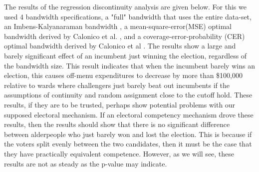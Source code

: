 The results of the regression discontinuity analysis are given below. 
For this we used 4 bandwidth specifications, a "full" bandwidth that uses the entire data-set, an Imbens-Kalyanaraman bandwidth \cite{IK_bandwidth}, a mean-square-error(MSE) optimal bandwidth derived by Calonico et al.
 \cite{CCF_MSE}, and a coverage-error-probability (CER) optimal bandwidth derived by Calonico et al \cite{CCF_CER}. 
 The results show a large and barely significant effect of an incumbent just winning the election, regardless of the bandwidth size. 
 This result indicates that when the incumbent barely wins an election, this causes off-menu expenditures to decrease by more than \$100,000 relative to wards where challengers just barely beat out incumbents if the assumptions of continuity and random assignment close to the cutoff hold. 
 These results, if they are to be trusted, perhaps show potential problems with our supposed electoral mechanism. 
 If an electoral competency mechanism drove these results, then the results should show that there is no significant difference between alderpeople who just barely won and lost the election. 
 This is because if the voters split evenly between the two candidates, then it must be the case that they have practically equivalent competence. 
 However, as we will see, these results are not as steady as the p-value may indicate. 

